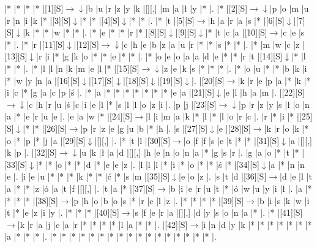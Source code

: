 \documentclass[11pt]{article}
\newcommand\drarr{$\rightarrow \!\!\!\!\! \downarrow$}
\newcommand\rarr{$\rightarrow$}
\newcommand\darr{$\downarrow$}
\begin{document}
\noindent\begin{Puzzle}{16}{28}|*	|*	|*	|*	|[1][S]\drarr	|b	|u	|r	|z	|y	|k	|[][,]{ }	|m	|a	|ł	|y	|*	|.
|*	|[2][S]\drarr	|p	|o	|m	|u	|r	|n	|i	|k	|*	|[3][S]\darr	|*	|*	|[4][S]\darr	|*	|*	|.
|*	|t	|[5][S]\rarr	|h	|a	|r	|a	|s	|*	|[6][S]\darr	|[7][S]\darr	|k	|*	|*	|w	|*	|*	|.
|*	|e	|*	|*	|r	|*	|[8][S]\darr	|[9][S]\darr	|*	|t	|c	|a	|[10][S]\rarr	|c	|e	|s	|*	|.
|*	|r	|[11][S]\darr	|[12][S]\drarr	|c	|h	|e	|b	|z	|a	|u	|r	|*	|*	|s	|*	|*	|.
|*	|m	|w	|c	|z	|[13][S]\darr	|r	|i	|*	|g	|k	|o	|*	|*	|e	|*	|*	|.
|*	|o	|e	|o	|a	|a	|d	|e	|*	|*	|r	|t	|[14][S]\darr	|*	|l	|*	|*	|.
|*	|l	|l	|n	|k	|m	|e	|l	|*	|[15][S]\drarr	|z	|e	|k	|s	|*	|*	|*	|.
|*	|o	|u	|*	|*	|b	|k	|i	|*	|w	|y	|n	|a	|[16][S]\darr	|[17][S]\darr	|[18][S]\darr	|[19][S]\darr	|.
|[20][S]\rarr	|k	|r	|e	|p	|a	|*	|k	|*	|i	|c	|*	|g	|a	|c	|p	|ś	|.
|*	|a	|*	|*	|*	|*	|*	|*	|*	|e	|a	|[21][S]\darr	|e	|l	|h	|a	|m	|.
|[22][S]\drarr	|c	|h	|r	|u	|ś	|c	|i	|e	|l	|*	|s	|l	|l	|o	|z	|i	|.
|p	|j	|[23][S]\drarr	|p	|r	|z	|y	|s	|ł	|o	|n	|a	|*	|e	|r	|u	|e	|.
|e	|a	|w	|*	|[24][S]\rarr	|l	|i	|m	|a	|k	|*	|l	|*	|l	|o	|r	|c	|.
|r	|*	|i	|*	|[25][S]\darr	|*	|*	|[26][S]\rarr	|p	|r	|z	|e	|g	|u	|b	|*	|h	|.
|s	|[27][S]\darr	|e	|[28][S]\rarr	|k	|r	|o	|k	|*	|o	|*	|p	|*	|j	|a	|[29][S]\darr	|[][,]{ }	|.
|*	|t	|l	|[30][S]\rarr	|o	|f	|f	|s	|e	|t	|*	|*	|[31][S]\darr	|a	|[][,]{ }	|k	|p	|.
|[32][S]\drarr	|u	|k	|ł	|a	|d	|[][,]{ }	|h	|e	|n	|o	|n	|a	|*	|g	|s	|r	|.
|g	|a	|o	|*	|t	|*	|[33][S]\darr	|*	|*	|o	|*	|*	|d	|*	|e	|e	|z	|.
|l	|l	|l	|*	|i	|*	|o	|*	|*	|ś	|*	|[34][S]\darr	|a	|*	|n	|n	|e	|.
|i	|e	|u	|*	|*	|*	|k	|*	|*	|ć	|*	|s	|m	|[35][S]\darr	|e	|o	|z	|.
|s	|t	|d	|[36][S]\rarr	|d	|e	|l	|t	|a	|*	|*	|z	|ó	|a	|t	|f	|[][,]{ }	|.
|t	|a	|*	|[37][S]\rarr	|b	|i	|e	|r	|u	|t	|*	|ó	|w	|u	|y	|i	|ł	|.
|a	|*	|*	|*	|*	|[38][S]\rarr	|p	|h	|o	|b	|o	|s	|*	|r	|c	|l	|z	|.
|*	|*	|*	|*	|[39][S]\rarr	|b	|i	|s	|k	|w	|i	|t	|*	|e	|z	|i	|y	|.
|*	|*	|*	|[40][S]\rarr	|s	|f	|e	|r	|a	|[][,]{ }	|d	|y	|s	|o	|n	|a	|*	|.
|*	|[41][S]\rarr	|k	|r	|a	|j	|c	|a	|r	|*	|*	|*	|*	|l	|a	|*	|*	|.
|[42][S]\rarr	|i	|n	|d	|y	|k	|*	|*	|*	|*	|*	|*	|*	|a	|*	|*	|*	|.
|*	|*	|*	|*	|*	|*	|*	|*	|*	|*	|*	|*	|*	|*	|*	|*	|*	|.\end{Puzzle}

\newpage
\end{document}
